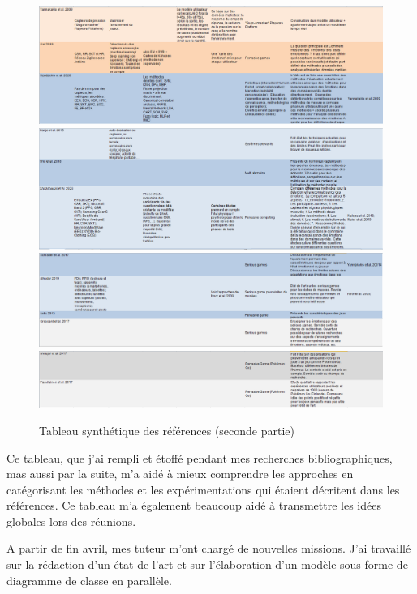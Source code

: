 \documentclass{article}
\begin{document}
		\begin{figure}
			\includegraphics[scale=0.47]{include/tri5.PNG}\\
			\includegraphics[scale=0.47]{include/tri6.PNG}\\
			\includegraphics[scale=0.47]{include/tri7.PNG}\\
			\includegraphics[scale=0.47]{include/tri8.PNG}
			\caption{Tableau synthétique des références (seconde partie)}
			\label{fig:tabsynt2}
		\end{figure}
		Ce tableau, que j'ai rempli et étoffé pendant mes recherches bibliographiques, mas aussi par la suite, m'a aidé à mieux comprendre les approches en catégorisant les méthodes et les expérimentations qui étaient décritent dans les références. 
		Ce tableau m'a également beaucoup aidé à transmettre les idées globales lors des réunions.\par
		A partir de fin avril, mes tuteur m'ont chargé de nouvelles missions. J'ai travaillé sur la rédaction d'un état de l'art et sur l'élaboration d'un modèle sous forme de diagramme de classe en parallèle.
\end{document}
